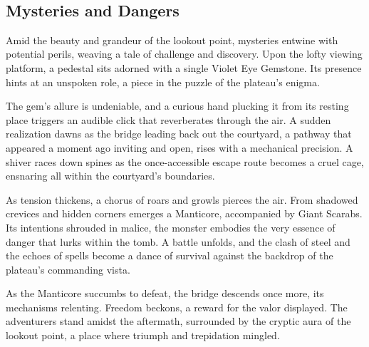 \vfill\eject\hfill\\\vspace*{0.5\fontdimen6\font}
\subsection*{Mysteries and Dangers}
{\entryfont
	Amid the beauty and grandeur of the lookout point, mysteries entwine with potential perils, weaving a tale of challenge and discovery. Upon the lofty viewing platform, a pedestal sits adorned with a single Violet Eye Gemstone. Its presence hints at an unspoken role, a piece in the puzzle of the plateau's enigma.
	
	The gem's allure is undeniable, and a curious hand plucking it from its resting place triggers an audible click that reverberates through the air. A sudden realization dawns as the bridge leading back out the courtyard, a pathway that appeared a moment ago inviting and open, rises with a mechanical precision. A shiver races down spines as the once-accessible escape route becomes a cruel cage, ensnaring all within the courtyard's boundaries.
	
	As tension thickens, a chorus of roars and growls pierces the air. From shadowed crevices and hidden corners emerges a Manticore, accompanied by  Giant Scarabs. Its intentions shrouded in malice, the monster embodies the very essence of danger that lurks within the tomb. A battle unfolds, and the clash of steel and the echoes of spells become a dance of survival against the backdrop of the plateau's commanding vista.
	
	 As the Manticore succumbs to defeat, the bridge descends once more, its mechanisms relenting. Freedom beckons, a reward for the valor displayed. The adventurers stand amidst the aftermath, surrounded by the cryptic aura of the lookout point, a place where triumph and trepidation mingled.
}
